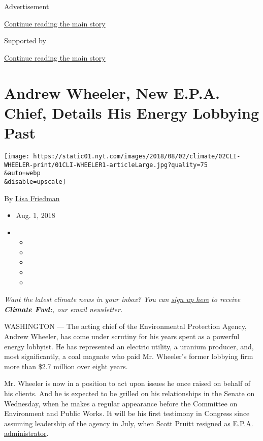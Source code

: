 Advertisement

\protect\hyperlink{after-top}{Continue reading the main story}

Supported by

\protect\hyperlink{after-sponsor}{Continue reading the main story}

\hypertarget{andrew-wheeler-new-epa-chief-details-his-energy-lobbying-past}{%
\section{Andrew Wheeler, New E.P.A. Chief, Details His Energy Lobbying
Past}\label{andrew-wheeler-new-epa-chief-details-his-energy-lobbying-past}}

\texttt{[image: https://static01.nyt.com/images/2018/08/02/climate/02CLI-WHEELER-print/01CLI-WHEELER1-articleLarge.jpg?quality=75\\\&auto=webp\\\&disable=upscale]}

By \href{https://www.nytimes.com/by/lisa-friedman}{Lisa Friedman}

\begin{itemize}
\item
  Aug. 1, 2018
\item
  \begin{itemize}
  \item
  \item
  \item
  \item
  \item
  \end{itemize}
\end{itemize}

\emph{Want the latest climate news in your inbox? You can}
\href{https://www.nytimes.com/newsletters/climate-change}{\emph{sign up
here}} \emph{to receive} \emph{\textbf{Climate Fwd:}}\emph{, our email
newsletter.}

WASHINGTON --- The acting chief of the Environmental Protection Agency,
Andrew Wheeler, has come under scrutiny for his years spent as a
powerful energy lobbyist. He has represented an electric utility, a
uranium producer, and, most significantly, a coal magnate who paid Mr.
Wheeler's former lobbying firm more than \$2.7 million over eight years.

Mr. Wheeler is now in a position to act upon issues he once raised on
behalf of his clients. And he is expected to be grilled on his
relationships in the Senate on Wednesday, when he makes a regular
appearance before the Committee on Environment and Public Works. It will
be his first testimony in Congress since assuming leadership of the
agency in July, when Scott Pruitt
\href{https://www.nytimes.com/2018/07/05/climate/scott-pruitt-epa-trump.html}{resigned
as E.P.A. administrator}.

